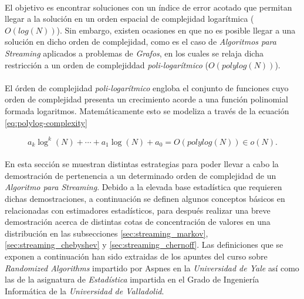 \documentclass{subfiles}
\begin{document}
      \paragraph{}
      El objetivo es encontrar soluciones con un índice de error acotado que permitan llegar a la solución en un orden espacial de complejidad logarítmica ($O(log(N))$). Sin embargo, existen ocasiones en que no es posible llegar a una solución en dicho orden de complejidad, como es el caso de \emph{Algoritmos para Streaming} aplicados a problemas de \emph{Grafos}, en los cuales se relaja dicha restricción a un orden de complejiddad \emph{poli-logarítmico} ($O(polylog(N))$).

      \paragraph{}
      El órden de complejidad \emph{poli-logarítmico} engloba el conjunto de funciones cuyo orden de complejidad presenta un crecimiento acorde a una función polinomial formada logaritmos. Matemáticamente esto se modeliza a través de la ecuación \eqref{eq:polylog-complexity}

      \begin{equation}
      \label{eq:polylog-complexity}
        a_{k}\log ^{k}(N)+\cdots +a_{1}\log(N)+a_{0} = O(polylog(N)) \in o(N).
      \end{equation}

      \paragraph{}
      En esta sección se muestran distintas estrategias para poder llevar a cabo la demostración de pertenencia a un determinado orden de complejidad de un \emph{Algoritmo para Streaming}. Debido a la elevada base estadística que requieren dichas demostraciones, a continuación se definen algunos conceptos básicos en relacionadas con estimadores estadísticos, para después realizar una breve demostración acerca de distintas cotas de concentración de valores en una distribución en las subsecciones \ref{sec:streaming_markov}, \ref{sec:streaming_chebyshev} y \ref{sec:streaming_chernoff}. Las definiciones que se exponen a continuación han sido extraidas de los apuntes del curso sobre \emph{Randomized Algorithms} \cite{aspnes2014notes} impartido por Aspnes en la \emph{Universidad de Yale} así como las de la asignatura de \emph{Estadística}\cite{estadistica2016notes} impartida en el Grado de Ingeniería Informática de la \emph{Universidad de Valladolid}.
\end{document}
